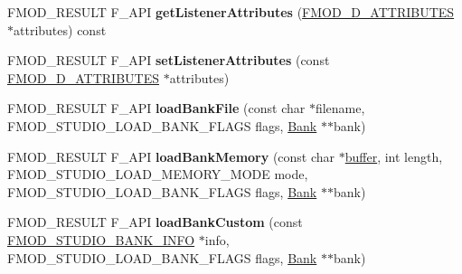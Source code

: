\begin{DoxyCompactItemize}
\item 
\hypertarget{class_f_m_o_d_1_1_studio_1_1_system_ad7a8c71173d467087ca3f8346990687c}{F\+M\+O\+D\+\_\+\+R\+E\+S\+U\+L\+T F\+\_\+\+A\+P\+I {\bfseries get\+Listener\+Attributes} (\hyperlink{struct_f_m_o_d__3_d___a_t_t_r_i_b_u_t_e_s}{F\+M\+O\+D\+\_\+D\+\_\+\+A\+T\+T\+R\+I\+B\+U\+T\+E\+S} $\ast$attributes) const }\label{class_f_m_o_d_1_1_studio_1_1_system_ad7a8c71173d467087ca3f8346990687c}

\item 
\hypertarget{class_f_m_o_d_1_1_studio_1_1_system_aa8c71494362d5cb83ddaa5847dc37860}{F\+M\+O\+D\+\_\+\+R\+E\+S\+U\+L\+T F\+\_\+\+A\+P\+I {\bfseries set\+Listener\+Attributes} (const \hyperlink{struct_f_m_o_d__3_d___a_t_t_r_i_b_u_t_e_s}{F\+M\+O\+D\+\_\+D\+\_\+\+A\+T\+T\+R\+I\+B\+U\+T\+E\+S} $\ast$attributes)}\label{class_f_m_o_d_1_1_studio_1_1_system_aa8c71494362d5cb83ddaa5847dc37860}

\item 
\hypertarget{class_f_m_o_d_1_1_studio_1_1_system_a1bb8fa675e0f69d4e705f795d17d3834}{F\+M\+O\+D\+\_\+\+R\+E\+S\+U\+L\+T F\+\_\+\+A\+P\+I {\bfseries load\+Bank\+File} (const char $\ast$filename, F\+M\+O\+D\+\_\+\+S\+T\+U\+D\+I\+O\+\_\+\+L\+O\+A\+D\+\_\+\+B\+A\+N\+K\+\_\+\+F\+L\+A\+G\+S flags, \hyperlink{class_f_m_o_d_1_1_studio_1_1_bank}{Bank} $\ast$$\ast$bank)}\label{class_f_m_o_d_1_1_studio_1_1_system_a1bb8fa675e0f69d4e705f795d17d3834}

\item 
\hypertarget{class_f_m_o_d_1_1_studio_1_1_system_ad2560777e2798f3c46c00f778f2757fe}{F\+M\+O\+D\+\_\+\+R\+E\+S\+U\+L\+T F\+\_\+\+A\+P\+I {\bfseries load\+Bank\+Memory} (const char $\ast$\hyperlink{structbuffer}{buffer}, int length, F\+M\+O\+D\+\_\+\+S\+T\+U\+D\+I\+O\+\_\+\+L\+O\+A\+D\+\_\+\+M\+E\+M\+O\+R\+Y\+\_\+\+M\+O\+D\+E mode, F\+M\+O\+D\+\_\+\+S\+T\+U\+D\+I\+O\+\_\+\+L\+O\+A\+D\+\_\+\+B\+A\+N\+K\+\_\+\+F\+L\+A\+G\+S flags, \hyperlink{class_f_m_o_d_1_1_studio_1_1_bank}{Bank} $\ast$$\ast$bank)}\label{class_f_m_o_d_1_1_studio_1_1_system_ad2560777e2798f3c46c00f778f2757fe}

\item 
\hypertarget{class_f_m_o_d_1_1_studio_1_1_system_ac734a111f8e0937ccd762e1176893e0b}{F\+M\+O\+D\+\_\+\+R\+E\+S\+U\+L\+T F\+\_\+\+A\+P\+I {\bfseries load\+Bank\+Custom} (const \hyperlink{struct_f_m_o_d___s_t_u_d_i_o___b_a_n_k___i_n_f_o}{F\+M\+O\+D\+\_\+\+S\+T\+U\+D\+I\+O\+\_\+\+B\+A\+N\+K\+\_\+\+I\+N\+F\+O} $\ast$info, F\+M\+O\+D\+\_\+\+S\+T\+U\+D\+I\+O\+\_\+\+L\+O\+A\+D\+\_\+\+B\+A\+N\+K\+\_\+\+F\+L\+A\+G\+S flags, \hyperlink{class_f_m_o_d_1_1_studio_1_1_bank}{Bank} $\ast$$\ast$bank)}\label{class_f_m_o_d_1_1_studio_1_1_system_ac734a111f8e0937ccd762e1176893e0b}


\end{DoxyCompactItemize}
